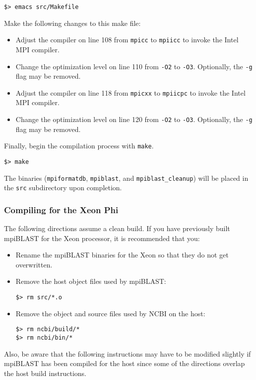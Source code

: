 \documentclass[10pt]{article}
\begin{document}
\begin{verbatim}
$> emacs src/Makefile
\end{verbatim}
\noindent Make the following changes to this make file:
\begin{itemize}
\item Adjust the compiler on line 108 from \verb^mpicc^ to \verb^mpiicc^ to invoke the Intel MPI compiler.
\item Change the optimization level on line 110 from \verb^-O2^ to \verb^-O3^.  Optionally, the \verb^-g^ flag may be removed.
\item Adjust the compiler on line 118 from \verb^mpicxx^ to \verb^mpiicpc^ to invoke the Intel MPI compiler.
\item Change the optimization level on line 120 from \verb^-O2^ to \verb^-O3^.  Optionally, the \verb^-g^ flag may be removed.
\end{itemize}
\noindent Finally, begin the compilation process with \verb^make^.
\begin{verbatim}
$> make
\end{verbatim}
\noindent The binaries (\verb^mpiformatdb^, \verb^mpiblast^, and \verb^mpiblast_cleanup^) will be placed in the \verb^src^ subdirectory upon completion.

\subsubsection{Compiling for the Xeon Phi} \label{sssec:mpiblastphi}

 \small The following directions assume a clean build.  If you have previously built mpiBLAST for the Xeon processor, it is recommended that you:
\begin{itemize}
\item Rename the mpiBLAST binaries for the Xeon so that they do not get overwritten.
\item Remove the host object files used by mpiBLAST:
\begin{verbatim}
$> rm src/*.o
\end{verbatim}
\item Remove the object and source files used by NCBI on the host:
\begin{verbatim}
$> rm ncbi/build/*
$> rm ncbi/bin/*
\end{verbatim}
\end{itemize}
\noindent Also, be aware that the following instructions may have to be modified slightly if mpiBLAST has been compiled for the host since some of the directions overlap the host build instructions.\\
\normalsize
\end{document}
